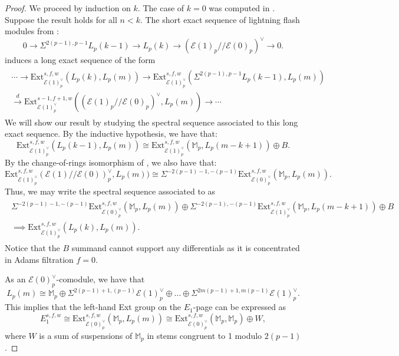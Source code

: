 \documentclass{amsart}
\theoremstyle{plain}
\numberwithin{theorem}{section}
\numberwithin{equation}{section}
\numberwithin{figure}{section}
\newcommand{\0}{\langle 0 \rangle }
\begin{document}
\begin{proof}
    We proceed by induction on $k$. The case of $k=0$ was computed in . Suppose the result holds for all $n <k$. The short exact sequence of lightning flash modules from :
    \[0 \to \Sigma^{2(p-1), p-1}L_p(k-1) \to L_p(k) \to (\mathcal{E}(1)_p // \mathcal{E}(0)_p)^\vee \to 0.\]    
    induces a long exact sequence of the form
    \begin{align}
    \label{eq:LESLightningFlashExtKleqM}
    \begin{split}
        \cdots \to \text{Ext}^{s,f,w}_{\mathcal{E}(1)^\vee_p}(L_p(k), L_p(m)) \to \text{Ext}^{s,f,w}_{\mathcal{E}(1)^\vee_p}(\Sigma^{2(p-1), p-1}L_p(k-1), L_p(m)) \\
        \xrightarrow{d}\text{Ext}^{s-1,f+1,w}_{\mathcal{E}(1)^\vee_p}((\mathcal{E}(1)_p//\mathcal{E}(0)_p)^\vee, L_p(m)) \to \cdots
    \end{split}
    \end{align}
    We will show our result by studying the spectral sequence associated to this long exact sequence. By the inductive hypothesis, we have that:
    \[\text{Ext}_{\mathcal{E}(1)^\vee_p}^{s,f,w}(L_p(k-1), L_p(m)) \cong \text{Ext}_{\mathcal{E}(1)^\vee_p}^{s,f,w}(\mathbb{M}_p, L_p(m-k+1)) \oplus B.\]
    By the change-of-rings isomorphism of , we also have that:
    \[\text{Ext}_{\mathcal{E}(1)^\vee_p}^{s,f,w}(\mathcal{E}(1)//\mathcal{E}(0))^\vee_p, L_p(m)) \cong \Sigma^{-2(p-1)-1, -(p-1)}\text{Ext}_{\mathcal{E}(0)^\vee_p}^{s,f,w}(\mathbb{M}_p, L_p(m)).\]
    Thus, we may write the spectral sequence associated to  as
    \begin{align}
    \label{eq:SSLightningFlashExtKleqM}
    \begin{split}
    \Sigma^{-2(p-1)-1, -(p-1)}\text{Ext}_{\mathcal{E}(0)^\vee_p}^{s,f,w}(\mathbb{M}_p, L_p(m)) \oplus \Sigma^{-2(p-1), -(p-1)}\text{Ext}^{s,f,w}_{\mathcal{E}(1)^\vee_p}(\mathbb{M}_p, L_p(m-k+1)) \oplus B \\
    \implies \text{Ext}_{\mathcal{E}(1)^\vee_p}^{s,f,w}(L_p(k), L_p(m)).
    \end{split}
    \end{align}
    Notice that the $B$ summand cannot support any differentials as it is concentrated in Adams filtration $f=0$.
    
    As an $\mathcal{E}(0)^\vee_p$-comodule, we have that
    \[L_p(m) \cong  \mathbb{M}_p \oplus \Sigma^{2(p-1)+1, (p-1)}\mathcal{E}(1)_p^\vee \oplus \dots \oplus \Sigma^{2m(p-1)+1, m(p-1)}\mathcal{E}(1)^\vee_p.\]
    This implies that the left-hand Ext group on the $E_1$-page can be expressed as
    \[E_1^{s,f,w} \cong\text{Ext}_{\mathcal{E}(0)^\vee_p}^{s,f,w}(\mathbb{M}_p, L_p(m)) \cong \text{Ext}_{\mathcal{E}(0)^\vee_p}^{s,f,w}(\mathbb{M}_p, \mathbb{M}_p) \oplus W,\]
    where $W$ is a sum of suspensions of $\mathbb{M}_p$ in stems congruent to 1 modulo $2(p-1)$. 
    

\end{proof}
\end{document}
